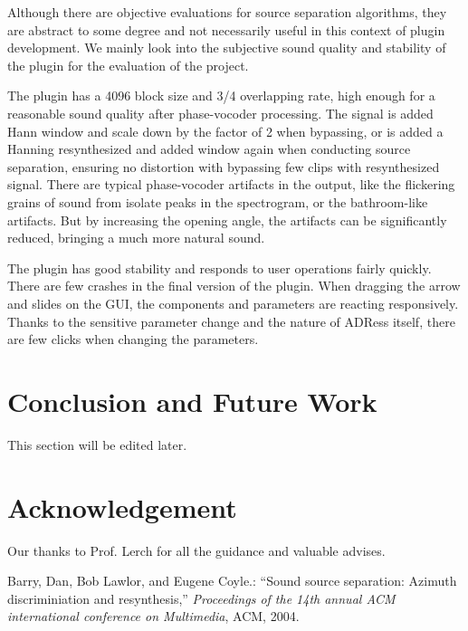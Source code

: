 \documentclass{sig-alternate}
\begin{document}
Although there are objective evaluations for source separation algorithms, they are abstract to some degree and not necessarily useful in this context of plugin development. We mainly look into the subjective sound quality and stability of the plugin for the evaluation of the project. 
    
The plugin has a 4096 block size and 3/4 overlapping rate, high enough for a reasonable sound quality after phase-vocoder processing. The signal is added Hann window and scale down by the factor of 2 when bypassing, or is added a Hanning resynthesized and added window again when conducting source separation, ensuring no distortion with bypassing few clips with resynthesized signal. There are typical phase-vocoder artifacts in the output, like the flickering grains of sound from isolate peaks in the spectrogram, or the bathroom-like artifacts. But by increasing the opening angle, the artifacts can be significantly reduced, bringing a much more natural sound.
     
The plugin has good stability and responds to user operations fairly quickly. There are few crashes in the final version of the plugin. When dragging the arrow and slides on the GUI, the components and parameters are reacting responsively. Thanks to the sensitive parameter change and the nature of ADRess itself, there are few clicks when changing the parameters.


\section{Conclusion and Future Work}\label{sec:conclusion}

This section will be edited later.

\section{Acknowledgement}\label{sec:acknowledgement}
Our thanks to Prof. Lerch for all the guidance and valuable advises.

\begin{thebibliography}{citations}

Barry, Dan, Bob Lawlor, and Eugene Coyle.:
``Sound source separation: Azimuth discriminiation and resynthesis,''
{\it Proceedings of the 14th annual ACM international conference on Multimedia},
 ACM, 2004.


\end{thebibliography}
\end{document}
